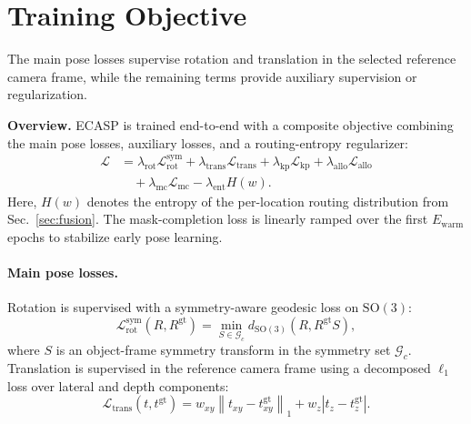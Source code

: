 \section{Training Objective}
\label{sec:loss}

\label{supp:losses}
The main pose losses supervise rotation and translation in the selected
reference camera frame, while the remaining terms provide auxiliary
supervision or regularization.


\noindent\textbf{Overview.}
ECASP is trained end-to-end with a composite objective combining the main pose losses, auxiliary losses, and a routing-entropy regularizer:
\begin{equation}
\begin{aligned}
\mathcal{L}
&= \lambda_{\mathrm{rot}}\mathcal{L}_{\mathrm{rot}}^{\mathrm{sym}}
 + \lambda_{\mathrm{trans}}\mathcal{L}_{\mathrm{trans}}
 + \lambda_{\mathrm{kp}}\mathcal{L}_{\mathrm{kp}}
 + \lambda_{\mathrm{allo}}\mathcal{L}_{\mathrm{allo}} \\
&\quad
 + \lambda_{\mathrm{mc}}\mathcal{L}_{\mathrm{mc}}
 - \lambda_{\mathrm{ent}}H(w).
\end{aligned}
\label{eq:total_loss}
\end{equation}
Here, \(H(w)\) denotes the entropy of the per-location routing distribution from Sec.~\ref{sec:fusion}.
The mask-completion loss is linearly ramped over the first \(E_{\mathrm{warm}}\) epochs to stabilize early pose learning.

\paragraph{Main pose losses.}
\label{sec:main_pose_losses}
Rotation is supervised with a symmetry-aware geodesic loss on \(\mathrm{SO}(3)\):
\begin{equation}
\mathcal{L}_{\mathrm{rot}}^{\mathrm{sym}}(R,R^{\mathrm{gt}})
=
\min_{S\in\mathcal{G}_c}
d_{\mathrm{SO}(3)}\!\left(R,R^{\mathrm{gt}}S\right),
\end{equation}
where \(S\) is an object-frame symmetry transform in the symmetry set \(\mathcal{G}_c\). Translation is supervised in the reference camera frame using a decomposed \(\ell_1\) loss over lateral and depth components:
\begin{equation}
\mathcal{L}_{\mathrm{trans}}(t,t^{\mathrm{gt}})
=
w_{xy}\left\|t_{xy}-t_{xy}^{\mathrm{gt}}\right\|_1
+
w_z\left|t_z-t_{z}^{\mathrm{gt}}\right|.
\end{equation}

